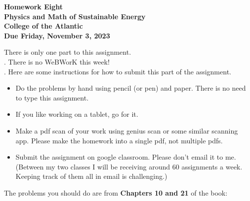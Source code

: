 \documentclass[12pt]{article}
\begin{document}
\pagestyle{empty}
 
\begin{center}
{\LARGE {\bf Homework Eight}}\\
\bigskip
{\Large {\bf Physics and Math of Sustainable Energy}}\\
\bigskip
{\Large {\bf College of the Atlantic}}\\
\bigskip
{ {\bf Due Friday, November 3, 2023}}\\ 
\end{center}
\medskip


\noindent There is only one part to this assignment.\\

.
There is no WeBWorK this week! \\


.  Here are some
instructions for how to submit this part of the assignment.
\begin{itemize}
\item Do the problems by hand using pencil (or pen) and paper.
  There is no need to type this assignment.
\item If you like working on a tablet, go for it. 
\item Make a pdf scan of your work using genius scan or some
  similar scanning app.  Please make the homework into a single
  pdf, not multiple pdfs.
\item Submit the assignment on google classroom.  Please don't
  email it to me.  (Between my two classes I will be receiving
  around 60 assignments a week.  Keeping track of them all in email 
  is challenging.)\\
\end{itemize}



\noindent The problems you should do are from {\bf Chapters 10 and 21} 
of the book:  \\  

\end{document}
